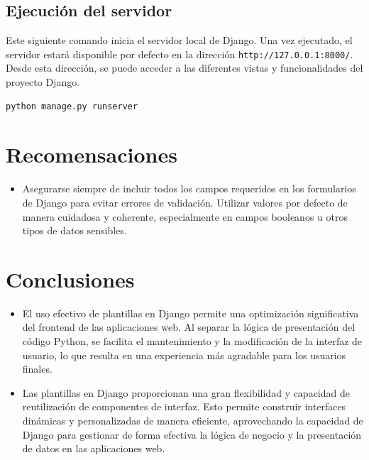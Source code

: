 \documentclass{article}
\begin{document}

  \subsection{Ejecución del servidor}
  Este siguiente comando inicia el servidor local de Django. Una vez ejecutado, el servidor estará disponible por defecto en la dirección 
  \texttt{http://127.0.0.1:8000/}. Desde esta dirección, se puede acceder a las diferentes vistas y funcionalidades del 
  proyecto Django.
  \begin{lstlisting}[language=bash]
    python manage.py runserver
  \end{lstlisting}
  

  \section{Recomensaciones}
  \begin{itemize}
    \item Asegurarse siempre de incluir todos los campos requeridos en los formularios de Django para evitar errores de validación. 
    Utilizar valores por defecto de manera cuidadosa y coherente, especialmente en campos booleanos u otros tipos de datos sensibles.
  \end{itemize}


  \section{Conclusiones}
  \begin{itemize}
    \item El uso efectivo de plantillas en Django permite una optimización significativa del frontend de las aplicaciones web. 
    Al separar la lógica de presentación del código Python, se facilita el mantenimiento y la modificación de la interfaz de 
    usuario, lo que resulta en una experiencia más agradable para los usuarios finales.
    \item Las plantillas en Django proporcionan una gran flexibilidad y capacidad de reutilización de componentes de interfaz. 
    Esto permite construir interfaces dinámicas y personalizadas de manera eficiente, aprovechando la capacidad de Django para 
    gestionar de forma efectiva la lógica de negocio y la presentación de datos en las aplicaciones web.
  \end{itemize}
  
\end{document}
